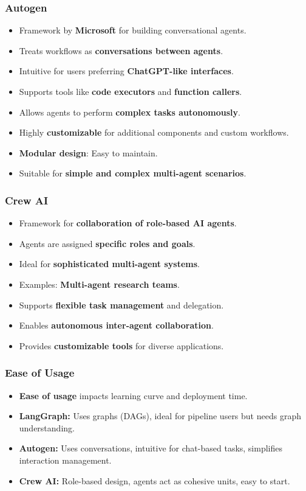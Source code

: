 \begin{frame}[fragile]\frametitle{Autogen}
\begin{itemize}
    \item Framework by \textbf{Microsoft} for building conversational agents.
    \item Treats workflows as \textbf{conversations between agents}.
    \item Intuitive for users preferring \textbf{ChatGPT-like interfaces}.
    \item Supports tools like \textbf{code executors} and \textbf{function callers}.
    \item Allows agents to perform \textbf{complex tasks autonomously}.
    \item Highly \textbf{customizable} for additional components and custom workflows.
    \item \textbf{Modular design}: Easy to maintain.
    \item Suitable for \textbf{simple and complex multi-agent scenarios}.
\end{itemize}
\end{frame}

\begin{frame}[fragile]\frametitle{Crew AI}
\begin{itemize}
    \item Framework for \textbf{collaboration of role-based AI agents}.
    \item Agents are assigned \textbf{specific roles and goals}.
    \item Ideal for \textbf{sophisticated multi-agent systems}.
    \item Examples: \textbf{Multi-agent research teams}.
    \item Supports \textbf{flexible task management} and delegation.
    \item Enables \textbf{autonomous inter-agent collaboration}.
    \item Provides \textbf{customizable tools} for diverse applications.
\end{itemize}
\end{frame}

\begin{frame}[fragile]\frametitle{Ease of Usage}
\begin{itemize}
    \item \textbf{Ease of usage} impacts learning curve and deployment time.
    \item \textbf{LangGraph:} Uses graphs (DAGs), ideal for pipeline users but needs graph understanding.
    \item \textbf{Autogen:} Uses conversations, intuitive for chat-based tasks, simplifies interaction management.
    \item \textbf{Crew AI:} Role-based design, agents act as cohesive units, easy to start.
\end{itemize}
\end{frame}

